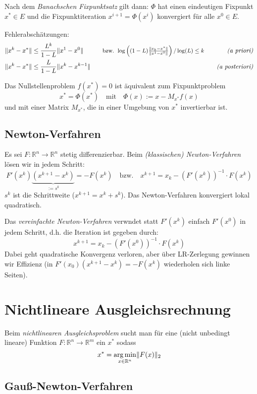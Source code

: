 \documentclass[a4paper,parskip=half*,DIV=15,fontsize=11pt]{scrartcl}
\DeclarePairedDelimiter\norm{\lVert}{\rVert}
\DeclareMathOperator*\argmin{arg\,min}
\begin{document}
Nach dem \emph{Banachschen Fixpunktsatz} gilt dann: $\Phi$ hat einen eindeutigen Fixpunkt $x^\ast \in E$ und die Fixpunktiteration $x^{i+1} = \Phi(x^i)$ konvergiert für alle $x^0 \in E$.

Fehlerabschätzungen:
\begin{alignat*}{3}
	\norm{x^k-x^\ast} &\le \frac{L^k}{1-L} \norm{x^1-x^0} &\mbox{\small $\quad\text{bzw. } \log \left( (1-L) \frac{\norm{x_k-x^\ast}}{\norm{x^1-x^0}} \right) / \log(L) \le k$}	\quad&&	\text{\emph{(a priori)}}	\\
	\norm{x^k-x^\ast} &\le \frac{L}{1-L} \norm{x^k-x^{k-1}}	& &&	\text{\emph{(a posteriori)}}
\end{alignat*}

Das Nullstellenproblem $f(x^\ast) = 0$ ist äquivalent zum Fixpunktproblem
\[ x^\ast = \Phi(x^\ast) \quad\text{mit}\quad \Phi(x) := x - M_{x^\ast} f(x) \]
und mit einer Matrix $M_{x^\ast}$, die in einer Umgebung von $x^\ast$ invertierbar ist.

\subsection{Newton-Verfahren}

Es sei $F : \mathbb{R}^n \to \mathbb{R}^n$ stetig differenzierbar. Beim \emph{(klassischen) Newton-Verfahren} lösen wir in jedem Schritt:
\[ F'(x^k) \underbrace{(x^{k+1} - x^k)}_{:= s^k} = -F(x^k) \quad\text{bzw.}\quad x^{k+1} = x_k - (F'(x^k))^{-1} \cdot F(x^k) \]
$s^k$ ist die Schrittweite ($x^{k+1} = x^k + s^k$). Das Newton-Verfahren konvergiert lokal quadratisch.

Das \emph{vereinfachte Newton-Verfahren} verwndet statt $F'(x^k)$ einfach $F'(x^0)$ in jedem Schritt, d.h. die Iteration ist gegeben durch:
\[ x^{k+1} = x_k - (F'(x^0))^{-1} \cdot F(x^k) \]
Dabei geht quadratische Konvergenz verloren, aber  über LR-Zerlegung gewinnen wir Effizienz (in $F'(x_0) (x^{k+1} - x^k) = -F(x^k)$ wiederholen sich linke Seiten).

\section{Nichtlineare Ausgleichsrechnung}

Beim \emph{nichtlinearen Ausgleichsproblem} sucht man für eine (nicht unbedingt lineare) Funktion $F : \mathbb{R}^n \to \mathbb{R}^m$ ein $x^\ast$ sodass
\[ x^\ast = \argmin_{x \in \mathbb{R}^n} \norm{F(x)}_2 \]

\subsection{Gauß-Newton-Verfahren}
\end{document}
